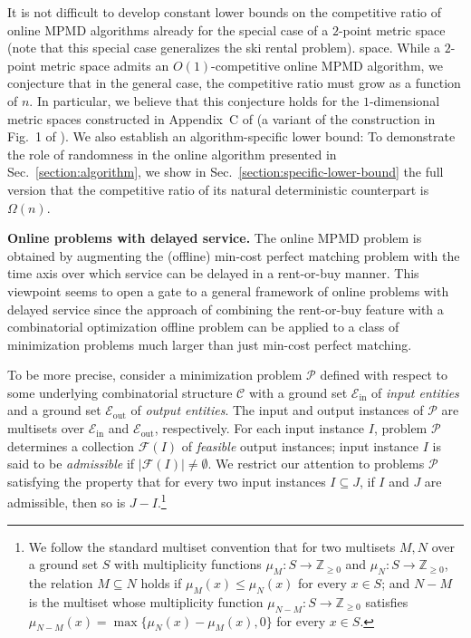 \documentclass[11pt]{article}
\def\LongVersion{}
\def\LongVersionEnd{}
\def\ShortVersion{}
\def\ShortVersionEnd{}
\renewcommand{\paragraph}[1]{\par\noindent\textbf{#1}}
\theoremstyle{definition}
\theoremstyle{plain}
\theoremstyle{definition}
\theoremstyle{plain}
\theoremstyle{definition}
\theoremstyle{plain}
\newcommand{\Sect}{Sec.}
\newcommand{\Integers}{\mathbb{Z}}
\begin{document}
It is not difficult to develop constant lower bounds on the competitive ratio
of online MPMD algorithms already for the special case of a $2$-point metric
\LongVersion %
space (note that this special case generalizes the ski rental problem).
\LongVersionEnd %
%
\ShortVersion %
space.
\ShortVersionEnd %
While a $2$-point metric space admits an $O (1)$-competitive online MPMD
algorithm, we conjecture that in the general case, the competitive ratio must
grow as a function of $n$.
In particular, we believe that this conjecture holds for the $1$-dimensional
metric spaces constructed in Appendix~C of \cite{EmekLW2015} (a variant of the
construction in Fig.~1 of \cite{ReingoldT1981}).
We also establish an algorithm-specific lower bound:
To demonstrate the role of randomness in the online algorithm presented in
\Sect{}~\ref{section:algorithm}, we show in
\LongVersion %
\Sect{}~\ref{section:specific-lower-bound}
\LongVersionEnd %
%
\ShortVersion %
the full version
\ShortVersionEnd %
%
that the competitive ratio of its natural deterministic counterpart is $\Omega
(n)$.

\paragraph{Online problems with delayed service.}
The online MPMD problem is obtained by augmenting the (offline) min-cost
perfect matching problem with the time axis over which service can be delayed
in a rent-or-buy manner.
This viewpoint seems to open a gate to a general framework of online problems
with delayed service since the approach of combining the rent-or-buy feature
with a combinatorial optimization offline problem can be applied to a class of
minimization problems much larger than just min-cost perfect matching.

To be more precise, consider a minimization problem $\mathcal{P}$ defined with
respect to some underlying combinatorial structure $\mathcal{C}$ with a ground
set
$\mathcal{E}_{\text{in}}$
of \emph{input entities} and a ground set
$\mathcal{E}_{\text{out}}$
of \emph{output entities}.
The input and output instances of $\mathcal{P}$ are multisets over
$\mathcal{E}_{\text{in}}$
and
$\mathcal{E}_{\text{out}}$,
respectively.
For each input instance $I$, problem $\mathcal{P}$
determines a collection $\mathcal{F}(I)$ of \emph{feasible}
output instances;
input instance $I$ is said to be \emph{admissible} if
$|\mathcal{F}(I)| \neq \emptyset$.
We restrict our attention to problems $\mathcal{P}$ satisfying
the property that for every two input instances
$I \subseteq J$,
if $I$ and $J$ are admissible, then so is
$J - I$.\footnote{%
We follow the standard multiset convention that for two multisets $M, N$ over
a ground set $S$ with multiplicity functions
$\mu_{M} : S \rightarrow \Integers_{\geq 0}$
and
$\mu_{N} : S \rightarrow \Integers_{\geq 0}$,
the relation
$M \subseteq N$
holds if
$\mu_{M}(x) \leq \mu_{N}(x)$
for every
$x \in S$; and
$N - M$
is the multiset whose multiplicity function
$\mu_{N - M} : S \rightarrow \Integers_{\geq 0}$
satisfies
$\mu_{N - M}(x) = \max\{ \mu_{N}(x) - \mu_{M}(x), 0 \}$
for every
$x \in S$.
}
\end{document}
